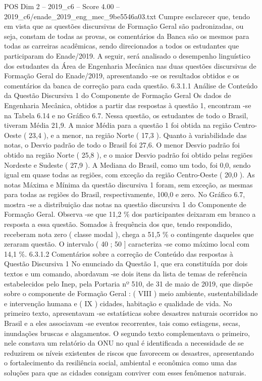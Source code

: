 \begin{textsample}{POS Dim 2 – 2019\_c6 – Score 4.00 – 2019\_c6/enade\_2019\_eng\_mec\_9be5546a03.txt}
Cumpre esclarecer que, tendo em vista que as questões discursivas de Formação Geral são padronizadas, ou seja, constam de todas as provas, os comentários da Banca são os mesmos para todas as carreiras acadêmicas, sendo direcionados a todos os estudantes que participaram do Enade/2019.
A seguir, será analisado o desempenho linguístico dos estudantes da Área de Engenharia Mecânica nas duas questões discursivas de Formação Geral do Enade/2019, apresentando -se os resultados obtidos e os comentários da banca de correção para cada questão. 6.3.1.1 Análise de Conteúdo da Questão Discursiva 1 do Componente de Formação Geral Os dados de Engenharia Mecânica, obtidos a partir das respostas à questão 1, encontram -se na Tabela 6.14 e no Gráfico 6.7.
Nessa questão, os estudantes de todo o Brasil, tiveram Média 21,9.
A maior Média para a questão 1 foi obtida na região Centro-Oeste ( 23,4 ), e a menor, na região Norte ( 17,3 ).
Quanto à variabilidade das notas, o Desvio padrão de todo o Brasil foi 27,6.
O menor Desvio padrão foi obtido na região Norte ( 25,8 ), e o maior Desvio padrão foi obtido pelas regiões Nordeste e Sudeste ( 27,9 ).
A Mediana do Brasil, como um todo, foi 0,0, sendo igual em quase todas as regiões, com exceção da região Centro-Oeste ( 20,0 ).
As notas Máxima e Mínima da questão discursiva 1 foram, sem exceção, as mesmas para todas as regiões do Brasil, respectivamente, 100,0 e zero.
No Gráfico 6.7, mostra -se a distribuição das notas na questão discursiva 1 do Componente de Formação Geral.
Observa -se que 11,2 \% dos participantes deixaram em branco a resposta a essa questão.
Somados à frequência dos que, tendo respondido, receberam nota zero ( classe modal ), chega a 51,5 \% o contingente daqueles que zeraram questão.
O intervalo ( 40 ; 50 ] caracteriza -se como máximo local com 14,1 \%. 6.3.1.2 Comentários sobre a correção de Conteúdo das respostas à Questão Discursiva 1 No enunciado da Questão 1, que era constituída por dois textos e um comando, abordavam -se dois itens da lista de temas de referência estabelecidos pelo Inep, pela Portaria nº 510, de 31 de maio de 2019, que dispõe sobre o componente de Formação Geral : ( VIII ) meio ambiente, sustentabilidade e intervenção humana e ( IX ) cidades, habitação e qualidade de vida.
No primeiro texto, apresentavam -se estatísticas sobre desastres naturais ocorridos no Brasil e a eles associavam -se eventos recorrentes, tais como estiagens, secas, inundações bruscas e alagamentos.
O segundo texto complementava o primeiro, nele constava um relatório da ONU no qual é identificada a necessidade de se reduzirem os níveis existentes de riscos que favorecem os desastres, apresentando o fortalecimento da resiliência social, ambiental e econômica como uma das soluções para que as cidades consigam conviver com esses fenômenos naturais.

\end{textsample}
